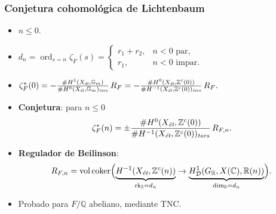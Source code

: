 \documentclass[handout]{beamer}
\newcommand{\CC}{\mathbb{C}}
\newcommand{\FF}{\mathbb{F}}
\newcommand{\PP}{\mathbb{P}}
\newcommand{\QQ}{\mathbb{Q}}
\newcommand{\RR}{\mathbb{R}}
\newcommand{\ZZ}{\mathbb{Z}}
\DeclareMathOperator{\coker}{coker}
\DeclareMathOperator{\ord}{ord}
\DeclareMathOperator{\rk}{rk}
\DeclareMathOperator{\vol}{vol}
\newcommand{\et}{\text{\it ét}}
\newcommand{\tors}{\text{\it tors}}
\begin{document}

\begin{frame}
  \frametitle{Conjetura cohomológica de Lichtenbaum}

  \begin{itemize}
  \item $n \le 0$.

  \item $d_n = \ord_{s = n} \zeta_F (s) = \begin{cases}
      r_1 + r_2, & n < 0\text{ par}, \\
      r_1, & n < 0\text{ impar}.
    \end{cases}$

  \item $\zeta_F^* (0) = -\frac{\# H^1 (X_\et, \mathbb{G}_m)}{\# H^0 (X_\et, \mathbb{G}_m)_\tors}\,R_F = -\frac{\# H^0 (X_\et, \ZZ^c (0))}{\# H^{-1} (X_\et, \ZZ^c (0))_\tors}\,R_F.$

  \item \textbf{Conjetura}: para $n \le 0$
    \[ \zeta_F^* (n) = \pm\frac{\# H^0 (X_\et, \ZZ^c (0))}{\# H^{-1} (X_\et, \ZZ^c (0))_\tors}\,R_{F,n}. \]

  \item \textbf{Regulador de Beilinson}:
    \[ R_{F,n} = \vol\coker \Bigl(\underbrace{H^{-1} (X_\et, \ZZ^c(n))}_{\rk_\ZZ = d_n} \to \underbrace{H^1_\mathcal{D} (G_\RR, X(\CC), \RR(n))}_{\dim_\RR = d_n}\Bigr). \]

  \item Probado para $F/\QQ$ abeliano, mediante TNC.
  \end{itemize}
\end{frame}


\iffalse
\begin{frame}
  \frametitle{Caso de curvas}

  \begin{itemize}
  \item $X = C/\FF_q$ cualquier curva.

  \item $\ord_{s = n} \zeta (X,s) = 0$ para $n < 0$.

  \item $\zeta (X,n) = \pm \frac{|H^0 (X_\et, \ZZ^c (n))|}{|H^{-1} (X_\et, \ZZ^c (n))| \cdot |H^1 (X_\et, \ZZ^c (n))|}$.

  \item Ejemplo singular: cúbica nodal $X = \PP^1_{\FF_q} / (0\sim 1)$.

    \begin{align*}
      H^{-1} (X_\et, \ZZ^c (n)) & = \ZZ/(q^{1-n} - 1), \\
      H^{0,1} (X_\et, \ZZ^c (n)) & = \ZZ/(q^{-n} - 1).
    \end{align*}

    \[ \zeta (X,s) = \frac{1}{1 - q^{-s}}. \]
  \end{itemize}
\end{frame}
\fi
\end{document}
